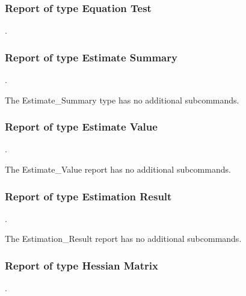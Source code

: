 \subsubsection{Report of type Equation Test}
.
\label{syntax:Report-EquationTest}


\subsubsection{Report of type Estimate Summary}
.
\label{syntax:Report-EstimateSummary}


The Estimate\_Summary type has no additional subcommands.

\subsubsection{Report of type Estimate Value}
.
\label{syntax:Report-EstimateValue}


The Estimate\_Value report has no additional subcommands.

\subsubsection{Report of type Estimation Result}
.
\label{syntax:Report-EstimationResult}


The Estimation\_Result report has no additional subcommands.

\subsubsection{Report of type Hessian Matrix}
.
\label{syntax:Report-HessianMatrix}

